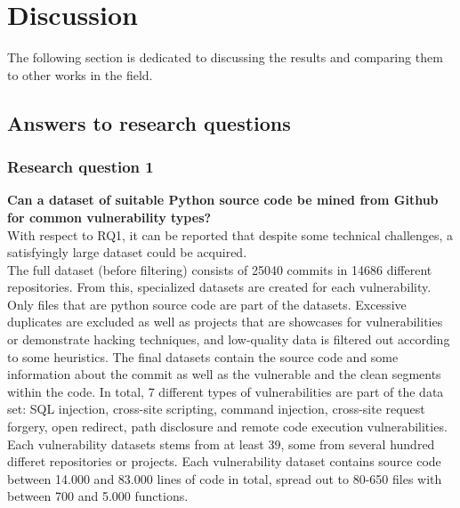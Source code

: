 \documentclass[
a4paper,
pagesize,
pdftex,
12pt,
twoside, %
BCOR=5mm, %
ngerman,
fleqn,
final,
]{scrartcl}
\begin{document}
	\section{Discussion}\label{Discussion}
	The following section is dedicated to discussing the results and comparing them to other works in the field. 
	
	\subsection{Answers to research questions}
	
	\subsubsection{Research question 1}
	\textbf{Can a dataset of suitable Python source code be mined from Github for common vulnerability types?}\\
	With respect to RQ1, it can be reported that despite some technical challenges, a satisfyingly large dataset could be acquired.\\
	The full dataset (before filtering) consists of 25040 commits in 14686 different repositories. From this, specialized datasets are created for each vulnerability. Only files that are python source code are part of the datasets. Excessive duplicates are excluded as well as projects that are showcases for vulnerabilities or demonstrate hacking techniques, and low-quality data is filtered out according to some heuristics. The final datasets contain the source code and some information about the commit as well as the vulnerable and the clean segments within the code. In total, 7 different types of vulnerabilities are part of the data set: SQL injection, cross-site scripting, command injection, cross-site request forgery, open redirect, path disclosure and remote code execution vulnerabilities.\\
	Each vulnerability datasets stems from at least 39, some from several hundred differet repositories or projects. Each vulnerability dataset contains source code between 14.000 and 83.000 lines of code in total, spread out to 80-650 files with between 700 and 5.000 functions.\\ 
	
\end{document}
